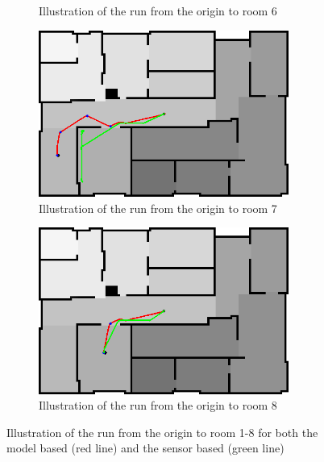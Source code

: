 \documentclass[../Head/Main.tex]{subfiles}
\begin{document}
\begin{figure}[H]
\begin{subfigure}[b]{0.49\textwidth}
    \caption{Illustration of the run from the origin to room 6}
    \label{fig:Test6}
  \end{subfigure}
  \hfill
  \begin{subfigure}[b]{0.49\textwidth}
    \centering
    \includegraphics[width=0.9\textwidth]{Modelbased_vs_Sensorbased/brushfireAndBugTest7}
    \caption{Illustration of the run from the origin to room 7}
    \label{fig:Test7}
  \end{subfigure}
  \begin{subfigure}[b]{0.49\textwidth}
    \centering
    \includegraphics[width=0.9\textwidth]{Modelbased_vs_Sensorbased/brushfireAndBugTest8}
    \caption{Illustration of the run from the origin to room 8}
    \label{fig:Test8}
  \end{subfigure}
  \caption{Illustration of the run from the origin to room 1-8 for both the model based (red line) and the sensor based (green line)}
\end{figure}
\end{document}
